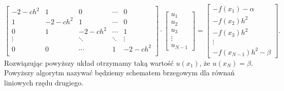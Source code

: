 $$
\left[ \begin{array}{ccccc}
-2-ch^2 & 1 & 0 & \cdots & 0 \\
1 & -2-ch^2 & 1& \cdots & 0 \\
0 & 1 & -2-ch^2& \cdots & 1 \\
\vdots &  & \ddots & \ddots & \vdots \\ 
0 & 0 & \cdots & 1 & -2-ch^2 \\
\end{array} \right] \cdot
\left[ \begin{array}{c}
u_1 \\
u_2 \\
u_3 \\
\vdots \\
u_{N-1} 
\end{array} \right] =
\left[ \begin{array}{c}
-f(x_1)-\alpha \\
-f(x_2)h^2 \\
-f(x_3)h^2\\
\vdots \\
-f(x_{N-1})h^2 -\beta    
\end{array} \right] . 
$$
Rozwiązując powyższy układ otrzymamy taką wartość $u(x_1)$, że $u(x_N) = \beta$. Powyższy algorytm nazywać będziemy schematem brzegowym dla równań liniowych rzędu drugiego. 